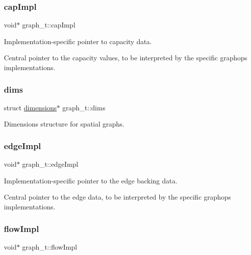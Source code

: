 \subsubsection{\texorpdfstring{cap\+Impl}{capImpl}}
{\footnotesize\ttfamily void$\ast$ graph\+\_\+t\+::cap\+Impl}



Implementation-\/specific pointer to capacity data. 

Central pointer to the capacity values, to be interpreted by the specific graphops implementations. \mbox{\label{structgraph__t_ab0b7dd9b19e20a1564ba1f02ad41511e}} 
\subsubsection{\texorpdfstring{dims}{dims}}
{\footnotesize\ttfamily struct \hyperlink{graphdata_8h_a08b79828d8e700b1ff86fc235a83089f}{dimensions}$\ast$ graph\+\_\+t\+::dims}



Dimensions structure for spatial graphs. 

\mbox{\label{structgraph__t_acadea26a56e788cb109413045138faba}} 
\subsubsection{\texorpdfstring{edge\+Impl}{edgeImpl}}
{\footnotesize\ttfamily void$\ast$ graph\+\_\+t\+::edge\+Impl}



Implementation-\/specific pointer to the edge backing data. 

Central pointer to the edge data, to be interpreted by the specific graphops implementations. \mbox{\label{structgraph__t_aff85993441e72a7815da3fa1b048e5eb}} 
\subsubsection{\texorpdfstring{flow\+Impl}{flowImpl}}
{\footnotesize\ttfamily void$\ast$ graph\+\_\+t\+::flow\+Impl}



